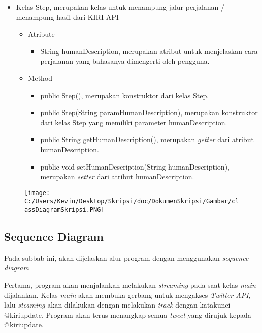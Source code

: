 \begin{itemize}
		\item Kelas Step, merupakan kelas untuk menampung jalur perjalanan / menampung hasil dari KIRI API
		
		
				\begin{itemize}
							\item Atribute
					
					
									\begin{itemize}
												\item String humanDescription, merupakan atribut untuk menjelaskan cara perjalanan yang bahasanya dimengerti oleh pengguna.
									\end{itemize}
					
							\item Method
					
					
									\begin{itemize}
												\item public Step(), merupakan konstruktor dari kelas Step.
												\item public Step(String paramHumanDescription), merupakan konstruktor dari kelas Step yang memiliki parameter humanDescription.
												\item public String getHumanDescription(), merupakan \textit{getter} dari atribut humanDescription.
												\item public void setHumanDescription(String humanDescription), merupakan \textit{setter} dari atribut humanDescription.
									\end{itemize}
				\end{itemize}
\end{itemize}

\begin{figure}[htbp]
	\centering
		\texttt{[image: C:/Users/Kevin/Desktop/Skripsi/doc/DokumenSkripsi/Gambar/classDiagramSkripsi.PNG]}
	\label{fig:class Diagram Skripsi}
\end{figure}



\subsection{Sequence Diagram}

Pada subbab ini, akan dijelaskan alur program dengan menggunakan \textit{sequence diagram}

Pertama, program akan menjalankan melakukan \textit{streaming} pada saat kelas \textit{main} dijalankan. Kelas \textit{main} akan membuka gerbang untuk mengakses \textit{Twitter API}, lalu \textit{steaming} akan dilakukan dengan melakukan \textit{track} dengan katakunci @kiriupdate. Program akan terus menangkap semua \textit{tweet} yang dirujuk kepada @kiriupdate.

